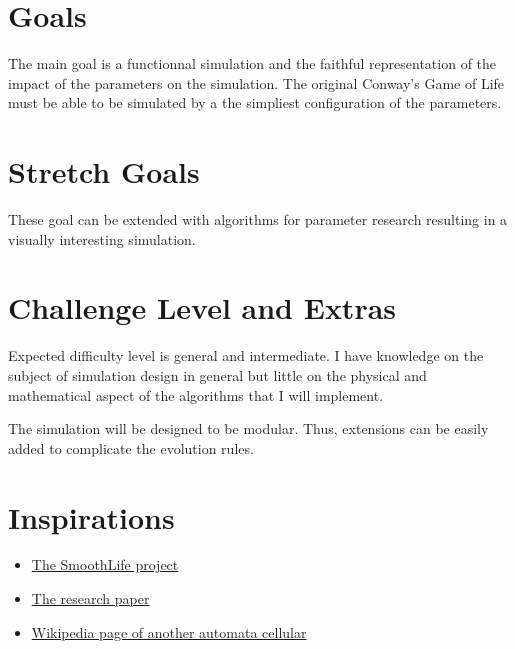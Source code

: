 \documentclass{article}
\begin{document}
\section{Goals}

The main goal is a functionnal simulation and the faithful representation of the impact of the parameters on the simulation.
The original Conway's Game of Life must be able to be simulated by a the simpliest configuration of the parameters.

\section{Stretch Goals}

These goal can be extended with algorithms for parameter research resulting in a visually interesting simulation.

\section{Challenge Level and Extras}

Expected difficulty level is general and intermediate. I have knowledge on the subject of simulation design in general but little on the physical and mathematical aspect of the algorithms that I will implement. 

The simulation will be designed to be modular. Thus, extensions can be easily added to complicate the evolution rules.
  

\section{Inspirations}

\begin{itemize}
    \item \href{https://sourceforge.net/projects/smoothlife/}{The SmoothLife project}  
    \item \href{http://arxiv.org/abs/1111.1567}{The research paper}    
    \item \href{https://fr.wikipedia.org/wiki/Lenia}{Wikipedia page of another automata cellular} 
\end{itemize}
\end{document}
